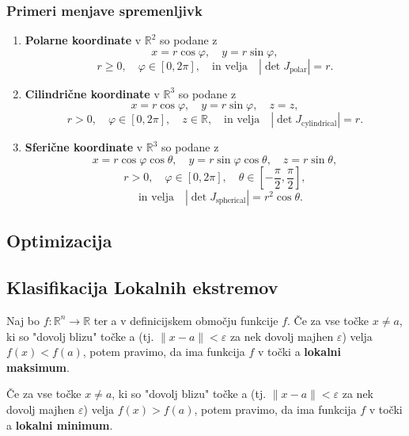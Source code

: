 \documentclass{article}
\begin{document}
\begin{multicols}{2}
	\subsubsection{Primeri menjave spremenljivk}

	\begin{enumerate}
		\item \textbf{Polarne koordinate} v \( \mathbb{R}^2 \) so podane z
		      \[
			      x = r \cos \varphi, \quad y = r \sin \varphi,
		      \]
		      \[
			      r \geq 0, \quad \varphi \in [0, 2\pi], \quad \text{in velja} \quad |\det J_{\text{polar}}| = r.
		      \]

		\item \textbf{Cilindrične koordinate} v \( \mathbb{R}^3 \) so podane z
		      \[
			      x = r \cos \varphi, \quad y = r \sin \varphi, \quad z = z,
		      \]
		      \[
			      r > 0, \quad \varphi \in [0, 2\pi], \quad z \in \mathbb{R}, \quad \text{in velja} \quad |\det J_{\text{cylindrical}}| = r.
		      \]

		\item \textbf{Sferične koordinate} v \( \mathbb{R}^3 \) so podane z
		      \[
			      x = r \cos \varphi \cos \theta, \quad y = r \sin \varphi \cos \theta, \quad z = r \sin \theta,
		      \]
		      \[
			      r > 0, \quad \varphi \in [0, 2\pi], \quad \theta \in \left[-\frac{\pi}{2}, \frac{\pi}{2}\right],
		      \]
		      \[
			      \quad \text{in velja} \quad |\det J_{\text{spherical}}| = r^2 \cos \theta.
		      \]
	\end{enumerate}


	\subsection{Optimizacija}

	\subsection{Klasifikacija Lokalnih ekstremov}

	Naj bo \( f: \mathbb{R}^n \rightarrow \mathbb{R} \) ter a v definicijskem območju funkcije \( f \).
	Če za vse točke \( x \neq a \), ki so "dovolj blizu" točke a (tj. \( \| x - a \| < \varepsilon \) za nek dovolj majhen \( \varepsilon \)) velja \( f(x) < f(a) \),
	potem pravimo, da ima funkcija \( f \) v točki a \textbf{lokalni maksimum}.

	Če za vse točke \( x \neq a \), ki so "dovolj blizu" točke a (tj. \( \| x - a \| < \varepsilon \) za nek dovolj majhen \( \varepsilon \)) velja \( f(x) > f(a) \),
	potem pravimo, da ima funkcija \( f \) v točki a \textbf{lokalni minimum}.


\end{multicols}
\end{document}
